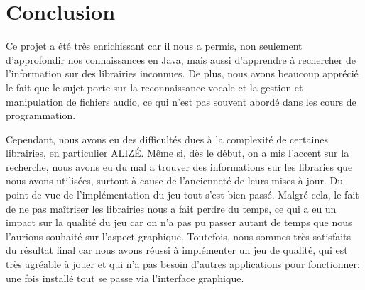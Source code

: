 \section{Conclusion}
\label{sec:conclusion}

Ce projet a été très enrichissant car il nous a permis, non seulement d'approfondir nos connaissances en Java, mais aussi d'apprendre à rechercher de
l'information sur des librairies inconnues. De plus, nous avons beaucoup apprécié le fait que le sujet porte sur la reconnaissance vocale et la gestion et
manipulation de fichiers audio, ce qui n'est pas souvent abordé dans les cours de programmation.

Cependant, nous avons eu des difficultés dues à la complexité de certaines librairies, en particulier ALIZÉ. Même si, dès le début, on a mis l'accent sur la
recherche, nous avons eu du mal a trouver des informations sur les libraries que nous avons utilisées, surtout à cause de l'ancienneté de leurs mises-à-jour.
Du point de vue de l'implémentation du jeu tout s'est bien passé. Malgré cela, le fait de ne pas maîtriser les librairies nous a fait perdre du temps, ce qui
a eu un impact sur  la qualité du jeu car on n'a pas pu passer autant de temps que nous l'aurions souhaité sur l'aspect graphique. Toutefois, nous sommes
très satisfaits du résultat final car nous avons réussi à implémenter un jeu de qualité, qui est très agréable à jouer et qui n'a pas besoin d'autres
applications pour fonctionner: une fois installé tout se passe via l'interface graphique.

